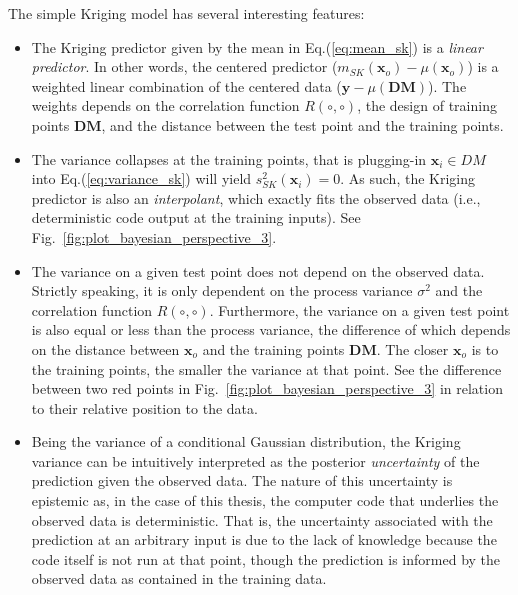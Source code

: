 The simple Kriging model has several interesting features:
\begin{itemize}

	\item The Kriging predictor given by the mean in Eq.(\ref{eq:mean_sk}) is a \emph{linear predictor}. 
	      In other words, the centered predictor ($m_{SK}(\bm{x}_o) - \mu (\bm{x}_o)$)  is a weighted linear combination of the centered data 
	      ($\mathbf{y} - \mu(\mathbf{DM})$).
				The weights depends on the correlation function $R(\circ,\circ)$, the design of training points $\mathbf{DM}$, and the distance between the test point and the training points.

	\item The variance collapses at the training points, that is plugging-in $\mathbf{x}_i \in DM$ into Eq.(\ref{eq:variance_sk}) will yield $s^2_{SK}(\mathbf{x}_i) = 0$.
	      As such, the Kriging predictor is also an \emph{interpolant}, which exactly fits the observed data (i.e., deterministic code output at the training inputs).
				See Fig.~\ref{fig:plot_bayesian_perspective_3}.

	\item The variance on a given test point does not depend on the observed data.
	      Strictly speaking, it is only dependent on the process variance $\sigma^2$ and the correlation function $R(\circ,\circ)$.
				Furthermore, the variance on a given test point is also equal or less than the process variance, 
				the difference of which depends on the distance between $\bm{x}_o$ and the training points $\mathbf{DM}$.
				The closer $\bm{x}_o$ is to the training points, the smaller the variance at that point.
				See the difference between two red points in Fig.~\ref{fig:plot_bayesian_perspective_3} in relation to their relative position to the data.

	\item Being the variance of a conditional Gaussian distribution, the Kriging variance can be intuitively interpreted as the posterior \emph{uncertainty} of the prediction given the observed data.
	      The nature of this uncertainty is epistemic as, in the case of this thesis, the computer code that underlies the observed data is deterministic.
				That is, the uncertainty associated with the prediction at an arbitrary input is due to the lack of knowledge because the code itself is not run at that point,
				though the prediction is informed by the observed data as contained in the training data.
\end{itemize}


